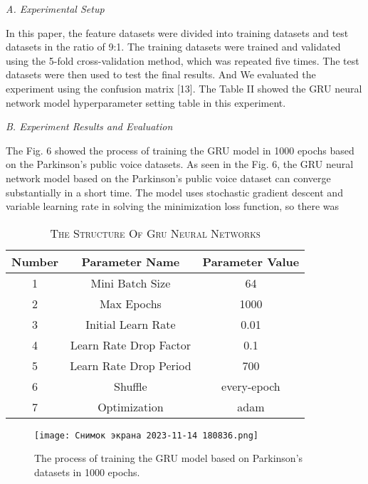 \textit{A. Experimental Setup}  
\begin{spacing}{1.25}
\end{spacing}
In this paper, the feature datasets were divided into
training datasets and test datasets in the ratio of 9:1.
The training datasets were trained and validated using
the 5-fold cross-validation method, which was repeated
five times. The test datasets were then used to test the
final results. And We evaluated the experiment using the
confusion matrix [13].
The Table II showed the GRU neural network model
hyperparameter setting table in this experiment.\begin{spacing}{1.25}
\textit{B. Experiment Results and Evaluation}
\end{spacing}
The Fig. 6 showed the process of training the GRU
model in 1000 epochs based on the Parkinson’s public
voice datasets.
As seen in the Fig. 6, the GRU neural network
model based on the Parkinson’s public voice dataset
can converge substantially in a short time. The model
uses stochastic gradient descent and variable learning rate
in solving the minimization loss function, so there was

\begin{table}[!h]
       \centering
       
       \caption{\small\textsc{The Structure Of Gru Neural Networks\\}}
       \small{
       \begin{tabular}{|c|c|c|}
       \hline
           \textbf{Number}  & \textbf{Parameter Name} & \textbf{Parameter Value}\\
           \hline
            1 & Mini Batch Size & 64 \\
           \hline
            2 & Max Epochs & 1000\\
           \hline
            3  & Initial Learn Rate &0.01 \\
            \hline
            4   & Learn Rate Drop Factor  & 0.1\\
            \hline
            5  & Learn Rate Drop Period  &700 \\
           \hline
            6  & Shuffle  &every-epoch\\
           \hline
            7   & Optimization  &adam\\
           \hline
       \end{tabular}}
   \end{table}

   \begin{figure}[!h]
\centering
\texttt{[image: Снимок экрана 2023-11-14 180836.png]}
\caption{The process of training the GRU model based on Parkinson’s
datasets in 1000 epochs.}
\end{figure}
\par
   
